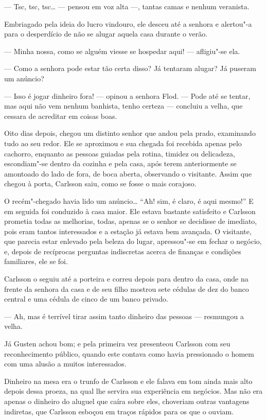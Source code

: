 --- Tsc, tsc, tsc\ldots{} --- pensou em voz alta ---, tantas camas e nenhum
veranista.

Embriagado pela ideia do lucro vindouro, ele desceu até a senhora e alertou"-a
para o desperdício de não se alugar aquela casa durante o verão.

--- Minha nossa, como se alguém viesse se hospedar aqui! --- afligiu"-se ela.

--- Como a senhora pode estar tão certa disso? Já tentaram alugar? Já
puseram um anúncio?

--- Isso é jogar dinheiro fora! --- opinou a senhora Flod. 
--- Pode até se tentar, mas aqui não vem nenhum banhista, tenho certeza ---
concluiu a velha, que cessara de acreditar em coisas boas.

Oito dias depois, chegou um distinto senhor que andou pela prado, examinando
tudo ao seu redor. Ele se aproximou e sua chegada foi recebida apenas pelo
cachorro, enquanto as pessoas guiadas pela rotina, timidez ou delicadeza,
escondiam"-se dentro da cozinha e pela casa, após terem anteriormente se
amontoado do lado de fora, de boca aberta, observando o visitante. Assim que
chegou à porta, Carlsson saiu, como se fosse o mais corajoso.

O recém"-chegado havia lido um anúncio\ldots{} ``Ah! sim, é claro, é aqui mesmo!'' E em
seguida foi conduzido à casa maior. Ele estava bastante satisfeito e
Carlsson prometia todas as melhorias, todas, apenas se o senhor se decidisse de
imediato, pois eram tantos interessados e a estação já estava bem avançada. O
visitante, que parecia estar enlevado pela beleza do lugar, apressou"-se em
fechar o negócio, e, depois de recíprocas perguntas indiscretas acerca de
finanças e condições familiares, ele se foi.

Carlsson o seguiu até a porteira e correu depois para dentro da casa, onde na
frente da senhora da casa e de seu filho mostrou sete cédulas de dez do banco
central e uma cédula de cinco de um banco privado.

--- Ah, mas é terrível tirar assim tanto dinheiro das pessoas --- resmungou a
velha.

Já Gusten achou bom; e pela primeira vez presenteou Carlsson com seu
reconhecimento público, quando este contava como havia pressionado o homem com
uma alusão a muitos interessados.

Dinheiro na mesa era o trunfo de Carlsson e ele falava em tom ainda mais alto
depois dessa proeza, na qual lhe servira sua experiência em negócios. Mas não
era apenas o dinheiro do aluguel que caíra sobre eles, choveriam outras vantagens
indiretas, que Carlsson esboçou em traços rápidos para os que o ouviam.

